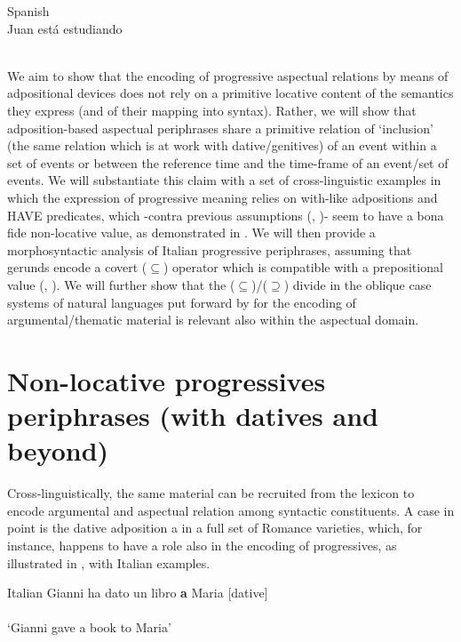 \documentclass[output=paper,modfonts,nonflat,newtxmath,colorlinks,citecolor=brown]{langsci/langscibook}
\begin{document}
     \ex Spanish\\\label{ex:franco:9b}
    \gll  Juan está estudiando\\
        \\
    \glt {}
    \z
    \z

We aim to show that the encoding of progressive aspectual relations by means of adpositional devices does not rely on a primitive locative content of the semantics they express (and of their mapping into syntax). Rather, we will show that adposition-based aspectual periphrases share a primitive relation of ‘inclusion’ (the same relation which is at work with dative/genitives) of an event within a set of events or between the reference time and the time-frame of an event/set of events. We will substantiate this claim with a set of cross-linguistic examples in which the expression of progressive meaning relies on {with}{}-like adpositions and HAVE predicates, which -{contra} previous assumptions (\citealt{Freeze1992}, \citealt{DenDikken1998})- seem to have a {bona fide} non-locative value, as demonstrated in \citet{Levinson2011}. We will then provide a morphosyntactic analysis of Italian progressive periphrases, assuming that gerunds encode a covert (${\subseteq}$) operator which is compatible with  a prepositional value (\citealt{Gallego2010}, \citealt{Franco2015}). We will further show that the (${\subseteq}$)/(${\supseteq}$) divide in the oblique case systems of natural languages put forward by \citet{FrancoManzini2017Ins} for the encoding of argumental/thematic material is relevant also within the aspectual domain.

\section{Non-locative progressives periphrases (with datives and beyond)}
\label{sec:franco:2}

Cross-linguistically, the same material can be recruited from the lexicon to encode argumental and aspectual relation among syntactic constituents. A case in point is the dative adposition {a} in a full set of Romance varieties, which, for instance, happens to have a role also in the encoding of progressives, as illustrated in , with Italian examples.  

\ea%
    Italian\label{ex:franco:10}
    \ea \label{ex:franco:10a}
    \gll Gianni ha dato un libro \textbf{a} Maria \hfill{[dative]}\\
        \\
    \glt ‘Gianni gave a book to Maria’
    
\end{document}
